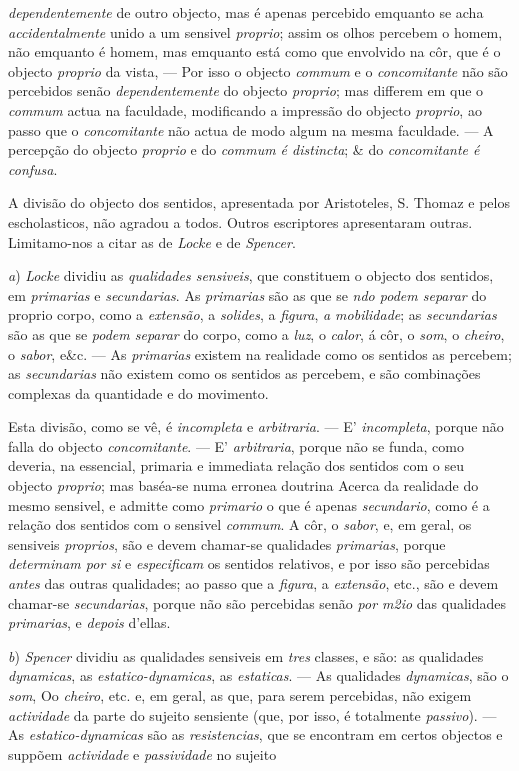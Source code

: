 \emph{dependentemente} de outro objecto, mas é apenas percebido emquanto se acha \emph{accidentalmente} unido a um sensivel \emph{proprio}; assim os olhos percebem o homem, não emquanto é homem, mas emquanto está como que envolvido na côr, que é o objecto \emph{proprio} da vista, --- Por isso o objecto \emph{commum} e o \emph{concomitante} não são percebidos senão \emph{dependentemente} do objecto \emph{proprio}; mas differem em que o \emph{commum} actua na faculdade, modificando a impressão do objecto \emph{proprio}, ao passo que o \emph{concomitante} não actua de modo algum na mesma faculdade. --- A percepção do objecto \emph{proprio} e do \emph{commum é distincta}; \& do \emph{concomitante é confusa}.\par A divisão do objecto dos sentidos, apresentada por Aristoteles, S. Thomaz e pelos escholasticos, não agradou a todos. Outros escriptores apresentaram outras. Limitamo-nos a citar as de \emph{Locke} e de \emph{Spencer}.\par \emph{a}) \emph{Locke} dividiu as \emph{qualidades sensiveis}, que constituem o objecto dos sentidos, em \emph{primarias} e \emph{secundarias}. As \emph{primarias} são as que se \emph{ndo podem separar} do proprio corpo, como a \emph{extensão}, a \emph{solides}, a \emph{figura}, \emph{a mobilidade}; as \emph{secundarias} são as que se \emph{podem separar} do corpo, como a \emph{luz}, o \emph{calor}, á côr, o \emph{som}, o \emph{cheiro}, o \emph{sabor}, e\&c. --- As \emph{primarias} existem na realidade como os sentidos as percebem; as \emph{secundarias} não existem como os sentidos as percebem, e são combinações complexas da quantidade e do movimento.\par Esta divisão, como se vê, é \emph{incompleta} e \emph{arbitraria}. --- E' \emph{incompleta}, porque não falla do objecto \emph{concomitante}. --- E' \emph{arbitraria}, porque não se funda, como deveria, na essencial, primaria e immediata relação dos sentidos com o seu objecto \emph{proprio}; mas baséa-se numa erronea doutrina Acerca da realidade do mesmo sensivel, e admitte como \emph{primario} o que é apenas \emph{secundario}, como é a relação dos sentidos com o sensivel \emph{commum}. A côr, o \emph{sabor}, e, em geral, os sensiveis \emph{proprios}, são e devem chamar-se qualidades \emph{primarias}, porque \emph{determinam por si} e \emph{especificam} os sentidos relativos, e por isso são percebidas \emph{antes} das outras qualidades; ao passo que a \emph{figura}, a \emph{extensão}, etc., são e devem chamar-se \emph{secundarias}, porque não são percebidas senão \emph{por m2io} das qualidades \emph{primarias}, e \emph{depois} d'ellas.\par \emph{b}) \emph{Spencer} dividiu as qualidades sensiveis em \emph{tres} classes, e são: as qualidades \emph{dynamicas}, as \emph{estatico-dynamicas}, as \emph{estaticas}. --- As qualidades \emph{dynamicas}, são o \emph{som}, Oo \emph{cheiro}, etc. e, em geral, as que, para serem percebidas, não exigem \emph{actividade} da parte do sujeito sensiente (que, por isso, é totalmente \emph{passivo}). --- As \emph{estatico-dynamicas} são as \emph{resistencias}, que se encontram em certos objectos e suppõem \emph{actividade} e \emph{passividade} no sujeito 